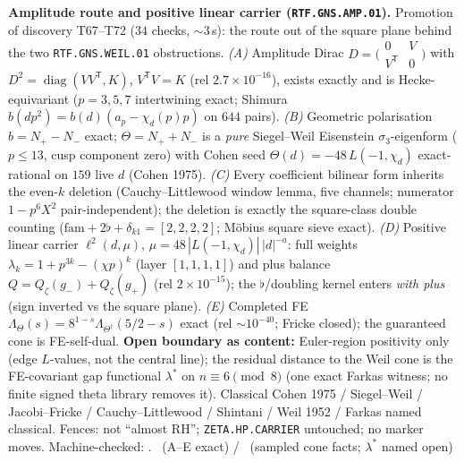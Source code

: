 \documentclass[11pt,a4paper]{article}
\begin{document}
\par\smallskip\noindent\textbf{Amplitude route and positive linear carrier
(\texttt{RTF.GNS.AMP.01}).}
Promotion of discovery T67--T72 ($34$ checks, $\sim3$\,s): the route out of the
square plane behind the two \texttt{RTF.GNS.WEIL.01} obstructions.
\emph{(A)} Amplitude Dirac
$D=\bigl(\begin{smallmatrix}0&V\\V^{\mathsf T}&0\end{smallmatrix}\bigr)$ with
$D^2=\operatorname{diag}(VV^{\mathsf T},K)$, $V^{\mathsf T}V=K$
(rel $2.7\times10^{-16}$), exists exactly and is Hecke-equivariant ($p=3,5,7$
intertwining exact; Shimura $b(dp^2)=b(d)(a_p-\chi_d(p)p)$ on $644$ pairs).
\emph{(B)} Geometric polarisation $b=N_+-N_-$ exact;
$\Theta=N_++N_-$ is a \emph{pure} Siegel--Weil Eisenstein $\sigma_3$-eigenform
($p\le13$, cusp component zero) with Cohen seed
$\Theta(d)=-48\,L(-1,\chi_d)$ exact-rational on $159$ live $d$ (Cohen 1975).
\emph{(C)} Every coefficient bilinear form inherits the even-$k$ deletion
(Cauchy--Littlewood window lemma, five channels; numerator $1-p^6X^2$
pair-independent); the deletion is exactly the square-class double counting
($\mathrm{fam}+2\flat+\delta_{k1}=[2,2,2,2]$; M\"obius square sieve exact).
\emph{(D)} Positive linear carrier $\ell^2(d,\mu)$,
$\mu=48\,|L(-1,\chi_d)|\,|d|^{-a}$: full weights
$\lambda_k=1+p^{3k}-(\chi p)^k$ (layer $[1,1,1,1]$) and plus balance
$Q=Q_\zeta(g_-)+Q_\zeta(g_+)$ (rel $2\times10^{-15}$); the $\flat$/doubling
kernel enters \emph{with plus} (sign inverted vs the square plane).
\emph{(E)} Completed FE
$\Lambda_\Theta(s)=8^{1-s}\Lambda_{\Theta^\dagger}(5/2-s)$ exact
(rel $\sim10^{-40}$; Fricke closed); the guaranteed cone is FE-self-dual.
\textbf{Open boundary as content:} Euler-region positivity only (edge
$L$-values, not the central line); the residual distance to the Weil cone is
the FE-covariant gap functional $\lambda^*$ on $n\equiv6\pmod 8$ (one exact
Farkas witness; no finite signed theta library removes it). Classical
Cohen 1975 / Siegel--Weil / Jacobi--Fricke / Cauchy--Littlewood / Shintani /
Weil 1952 / Farkas named classical. Fences: not ``almost RH'';
\texttt{ZETA.HP.CARRIER} untouched; no marker moves.
Machine-checked: .
\mE\ (A--E exact) / \mC\ (sampled cone facts; $\lambda^*$ named open)
\end{document}
